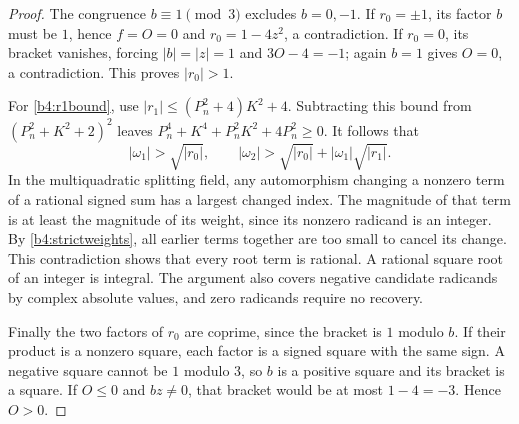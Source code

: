 \begin{proof}
The congruence $b\equiv1\pmod3$ excludes $b=0,-1$.  If
$r_0=\pm1$, its factor $b$ must be $1$, hence $f=O=0$ and
$r_0=1-4z^2$, a contradiction.  If $r_0=0$, its bracket vanishes,
forcing $|b|=|z|=1$ and $3O-4=-1$; again $b=1$ gives $O=0$,
a contradiction.  This proves $|r_0|>1$.

For \eqref{b4:r1bound}, use
$|r_1|\le(P_n^2+4)K^2+4$.  Subtracting this bound from
$(P_n^2+K^2+2)^2$ leaves
$P_n^4+K^4+P_n^2K^2+4P_n^2\ge0$.
It follows that
\[
 |\omega_1|>\sqrt{|r_0|},\qquad
 |\omega_2|>\sqrt{|r_0|}
                    +|\omega_1|\sqrt{|r_1|}.
 \tag{B4.14}\label{b4:strictweights}
\]
In the multiquadratic splitting field, any automorphism changing a
nonzero term of a rational signed sum has a largest changed index.
The magnitude of that term is at least the magnitude of its weight,
since its nonzero radicand is an integer.  By
\eqref{b4:strictweights}, all earlier terms together are too small
to cancel its change.  This contradiction shows that every root
term is rational.  A rational square root of an integer is integral.
The argument also covers negative candidate radicands by complex
absolute values, and zero radicands require no recovery.

Finally the two factors of $r_0$ are coprime, since the bracket
is $1$ modulo $b$.  If their product is a nonzero square, each
factor is a signed square with the same sign.  A negative square
cannot be $1$ modulo $3$, so $b$ is a positive square and its
bracket is a square.  If $O\le0$ and $bz\ne0$, that bracket
would be at most $1-4=-3$.  Hence $O>0$.
\end{proof}

